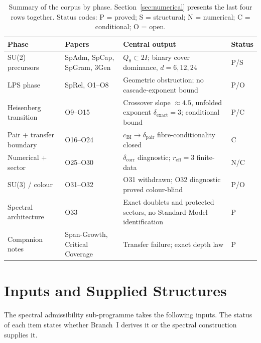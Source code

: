 \documentclass[11pt,a4paper]{article}
\theoremstyle{definition}
\newcommand{\dimpair}{\delta_{\mathrm{pair}}}
\newcommand{\cchi}{c_{\mathrm{BI}}}
\begin{document}
      \begin{table}[ht]
        \centering
        \caption{Summary of the corpus by phase.
        Section~\ref{sec:numerical} presents the last four rows together.
        Status codes: P = proved; S = structural; N = numerical; C = conditional; O = open.}
        \label{tab:papers}
        \renewcommand{\arraystretch}{1.2}
        \begin{tabular}{@{}>{\raggedright\arraybackslash}p{2.7cm}
          >{\raggedright\arraybackslash}p{3.1cm}
          >{\raggedright\arraybackslash}p{7.3cm}l@{}}
          \toprule
          Phase & Papers & Central output & Status \\
          \midrule
          SU(2) precursors & SpAdm, SpCap, SpGram, 3Gen & $Q_8 \subset 2I$; binary cover dominance,
            $d = 6, 12, 24$ & P/S \\
          LPS phase & SpRel, O1--O8 & Geometric obstruction; no cascade-exponent bound & P/O \\
          Heisenberg transition & O9--O15 & Crossover slope $\approx 4.5$, unfolded exponent
            $\delta_{\mathrm{exact}} = 3$; conditional bound & P/C \\
          Pair + transfer boundary & O16--O24 & $\cchi \to \dimpair$ fibre-conditionality closed & C \\
          Numerical + sector & O25--O30 & $\delta_{\mathrm{corr}}$ diagnostic;
            $r_{\mathrm{eff}} = 3$ finite-data & N/C \\
          SU(3) / colour & O31--O32 & O31 withdrawn; O32 diagnostic proved colour-blind & P/O \\
          Spectral architecture & O33 & Exact doublets and protected sectors, no
            Standard-Model identification & P \\
          Companion notes & Span-Growth, Critical Coverage & Transfer failure; exact depth law & P \\
          \bottomrule
        \end{tabular}
      \end{table}

  \section{Inputs and Supplied Structures}
    \label{sec:inputs}

    The spectral admissibility sub-programme takes the following inputs.
    The status of each item states whether Branch~I derives it or the spectral construction supplies it.
\end{document}
